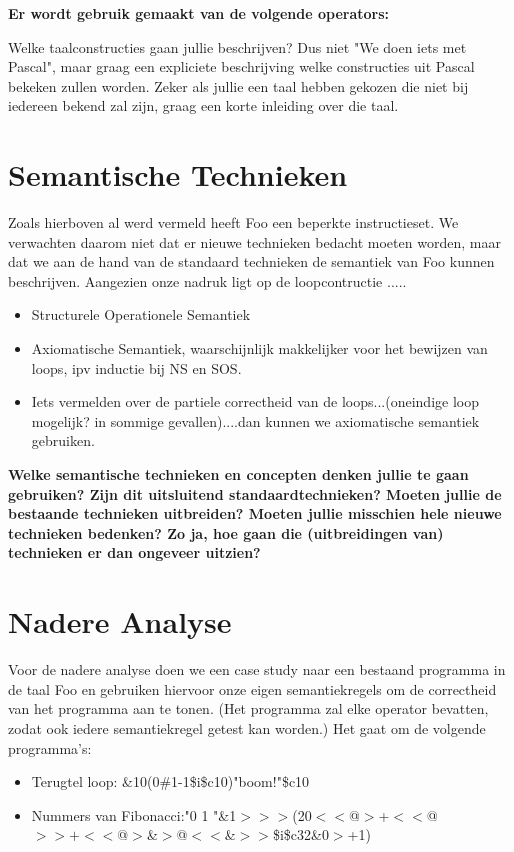 \documentclass[11pt]{article}
\begin{document}
{\bf
Er wordt gebruik gemaakt van de volgende operators: 

Welke taalconstructies gaan jullie beschrijven? Dus niet "We doen iets met Pascal", maar graag een expliciete beschrijving welke constructies uit Pascal bekeken zullen worden. Zeker als jullie een taal hebben gekozen die niet bij iedereen bekend zal zijn, graag een korte inleiding over die taal.
}



\section{Semantische Technieken}

Zoals hierboven al werd vermeld heeft Foo een beperkte instructieset. We verwachten daarom niet dat er nieuwe technieken bedacht moeten worden, maar dat we aan de hand van de standaard technieken de semantiek van Foo kunnen beschrijven. Aangezien onze nadruk ligt op de loopcontructie .....

\begin{itemize}
\item Structurele Operationele Semantiek
\item Axiomatische Semantiek, waarschijnlijk makkelijker voor het bewijzen van loops, ipv inductie bij NS en SOS.
\item Iets vermelden over de partiele correctheid van de loops...(oneindige loop mogelijk? in sommige gevallen)....dan kunnen we axiomatische semantiek gebruiken.
\end{itemize}



{\bf
Welke semantische technieken en concepten denken jullie te gaan gebruiken? Zijn dit uitsluitend standaardtechnieken? Moeten jullie de bestaande technieken uitbreiden? Moeten jullie misschien hele nieuwe technieken bedenken? Zo ja, hoe gaan die (uitbreidingen van) technieken er dan ongeveer uitzien?
}
\section{Nadere Analyse}

Voor de nadere analyse doen we een case study naar een bestaand programma in de taal Foo en gebruiken hiervoor onze eigen semantiekregels om de correctheid van het programma aan te tonen. (Het programma zal elke operator bevatten, zodat ook iedere semantiekregel getest kan worden.) Het gaat om de volgende programma's:

\begin{itemize}
\item Terugtel loop: \&10(0\#1-1\$i\$c10)"boom!"\$c10
\item Nummers van Fibonacci:\newline "0 1 "\&1\(>>>\)(20\(<<\)@\(>\)+\(<<\)@\(>>+<<\)@\(>\)\&\(>\)@\(<<\)\&\(>>\)\$i\$c32\&0\(>\)+1)
\end{itemize}
\end{document}
